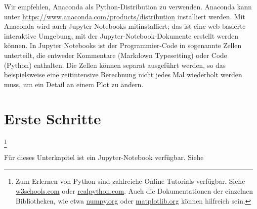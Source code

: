 Wir empfehlen, Anaconda als Python-Distribution zu verwenden. Anaconda kann unter \url{https://www.anaconda.com/products/distribution} installiert werden.  Mit Anaconda wird auch Jupyter Notebooks mitinstalliert; das ist eine web-basierte interaktive Umgebung, mit der Jupyter-Notebook-Dokumente erstellt werden können. In Jupyter Notebooks ist der Programmier-Code in sogenannte Zellen unterteilt, die entweder Kommentare (Markdown Typesetting) oder Code (Python) enthalten. Die Zellen können separat ausgeführt werden, so das beispielsweise eine zeitintensive Berechnung nicht jedes Mal wiederholt werden muss, um ein Detail an einem Plot zu ändern. 

\section{Erste Schritte} \footnote{Zum Erlernen von Python sind zahlreiche Online Tutorials verfügbar. Siehe \href{https://www.w3schools.com/python/}{w3schools.com} 
oder \href{https://realpython.com/jupyter-notebook-introduction/}{realpython.com}. Auch die Dokumentationen der einzelnen Bibliotheken, wie etwa \href{https://numpy.org/doc/stable/user/quickstart.html}{numpy.org}
oder \href{https://matplotlib.org/stable/tutorials/introductory/pyplot.html}{matplotlib.org} können hilfreich sein.}

\label{chap:py:sec:ersteschritte}

\begin{center}
\begin{tcolorbox}[enhanced,width=6in,center upper,
    fontupper=\large,drop fuzzy shadow southwest,
    colframe=blue!50!black,colback=blue!10]
Für dieses Unterkapitel ist ein Jupyter-Notebook verfügbar. Siehe  
\end{tcolorbox}
\end{center}

